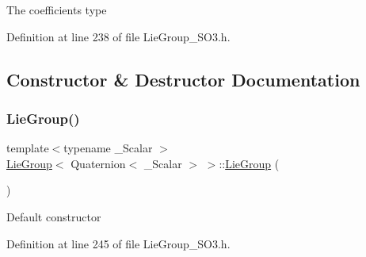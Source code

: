 The coefficients type 

Definition at line 238 of file Lie\+Group\+\_\+\+S\+O3.\+h.



\subsection{Constructor \& Destructor Documentation}
\hypertarget{class_lie_group_3_01_quaternion_3_01___scalar_01_4_01_4_a0810d682a2a637aa77877e84695bc884}{}\label{class_lie_group_3_01_quaternion_3_01___scalar_01_4_01_4_a0810d682a2a637aa77877e84695bc884} 
\subsubsection{\texorpdfstring{Lie\+Group()}{LieGroup()}\hspace{0.1cm}{\footnotesize\ttfamily [1/9]}}
{\footnotesize\ttfamily template$<$typename \+\_\+\+Scalar $>$ \\
\hyperlink{class_lie_group}{Lie\+Group}$<$ Quaternion$<$ \+\_\+\+Scalar $>$ $>$\+::\hyperlink{class_lie_group}{Lie\+Group} (\begin{DoxyParamCaption}{ }\end{DoxyParamCaption})\hspace{0.3cm}{\ttfamily [inline]}}

Default constructor 

Definition at line 245 of file Lie\+Group\+\_\+\+S\+O3.\+h.

\hypertarget{class_lie_group_3_01_quaternion_3_01___scalar_01_4_01_4_a56d1bf6da37ec19a2e2857f5c982410a}{}\label{class_lie_group_3_01_quaternion_3_01___scalar_01_4_01_4_a56d1bf6da37ec19a2e2857f5c982410a} 
